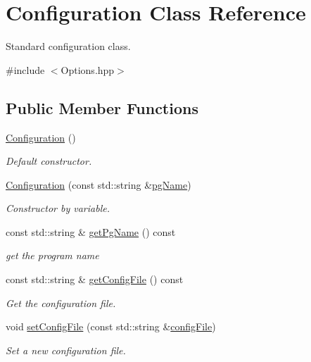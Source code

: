 \hypertarget{classConfiguration}{
\section{Configuration Class Reference}
\label{classConfiguration}
}


Standard configuration class.  




{\ttfamily \#include $<$Options.hpp$>$}

\subsection*{Public Member Functions}
\begin{DoxyCompactItemize}
\item 
\hypertarget{classConfiguration_a779947337bf652f0e773cb29f37f14ba}{
\hyperlink{classConfiguration_a779947337bf652f0e773cb29f37f14ba}{Configuration} ()}
\label{classConfiguration_a779947337bf652f0e773cb29f37f14ba}

\begin{DoxyCompactList}\small\item\em Default constructor. \item\end{DoxyCompactList}\item 
\hyperlink{classConfiguration_a48b0af047c4e795da9ccac5faeadf235}{Configuration} (const std::string \&\hyperlink{classConfiguration_a6be67a6bcdc6c0a4045f0aac934c9515}{pgName})
\begin{DoxyCompactList}\small\item\em Constructor by variable. \item\end{DoxyCompactList}\item 
const std::string \& \hyperlink{classConfiguration_adcc285d77bf3d36d8f5919cb720af33b}{getPgName} () const 
\begin{DoxyCompactList}\small\item\em get the program name \item\end{DoxyCompactList}\item 
const std::string \& \hyperlink{classConfiguration_ad726c36a2f3393247dc1588d5bf5d9cc}{getConfigFile} () const 
\begin{DoxyCompactList}\small\item\em Get the configuration file. \item\end{DoxyCompactList}\item 
void \hyperlink{classConfiguration_a65ffb975fe13c3b2ff4b415a3a0a7a75}{setConfigFile} (const std::string \&\hyperlink{classConfiguration_a03c36cb0cd25e37cda3f9de23ba8a703}{configFile})
\begin{DoxyCompactList}\small\item\em Set a new configuration file. \item\end{DoxyCompactList}\end{DoxyCompactItemize}
